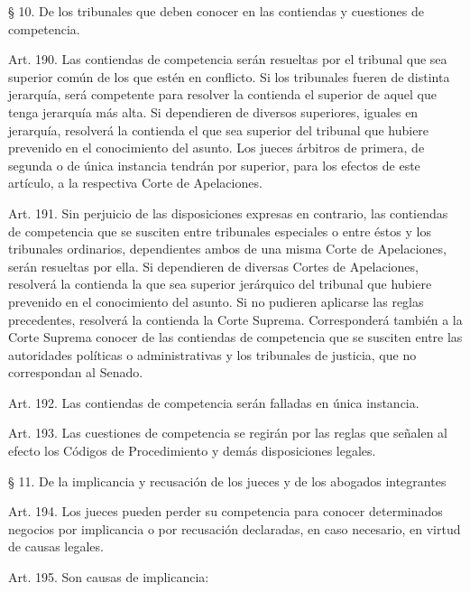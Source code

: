     § 10. De los tribunales que deben conocer en las contiendas y cuestiones de competencia.


    Art. 190. Las contiendas de competencia serán resueltas por el tribunal que sea superior común de los que estén en conflicto.
    Si los tribunales fueren de distinta jerarquía, será competente para resolver la contienda el superior de aquel que tenga jerarquía más alta.
    Si dependieren de diversos superiores, iguales en jerarquía, resolverá la contienda el que sea superior del tribunal que hubiere prevenido en el conocimiento del asunto.
    Los jueces árbitros de primera, de segunda o de única instancia tendrán por superior, para los efectos de este artículo, a la respectiva Corte de Apelaciones.


    Art. 191. Sin perjuicio de las disposiciones expresas en contrario, las contiendas de competencia que se susciten entre tribunales especiales o entre éstos y los tribunales ordinarios, dependientes ambos de una misma Corte de Apelaciones, serán resueltas por ella.
    Si dependieren de diversas Cortes de Apelaciones, resolverá la contienda la que sea superior jerárquico del tribunal que hubiere prevenido en el conocimiento del asunto.
    Si no pudieren aplicarse las reglas precedentes, resolverá la contienda la Corte Suprema.
    Corresponderá también a la Corte Suprema conocer de las contiendas de competencia que se susciten entre las autoridades políticas o administrativas y los tribunales de justicia, que no correspondan al Senado.



    Art. 192. Las contiendas de competencia serán falladas en única instancia.

    Art. 193. Las cuestiones de competencia se regirán por las reglas que señalen al efecto los Códigos de Procedimiento y demás disposiciones legales.

    § 11. De la implicancia y recusación de los jueces y de los abogados integrantes


    Art. 194. Los jueces pueden perder su competencia para conocer determinados negocios por implicancia o por recusación declaradas, en caso necesario, en virtud de causas legales.

    Art. 195. Son causas de implicancia:

